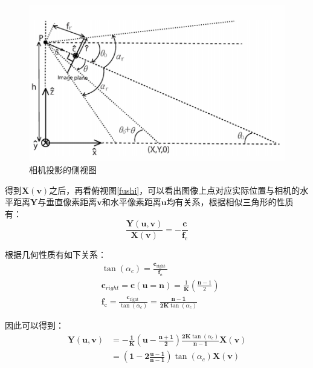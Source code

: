 \documentclass[cn,12pt,color=mine,scheme=chinese,bibstyle=gb7714-2015]{elegantbook}
\begin{document}
\begin{figure}[h]
	\centering
	\includegraphics[width=.75\linewidth]{images/ceshi}
	\caption{相机投影的侧视图}
	\label{ceshi}
\end{figure}

得到$\mathbf{X}(\mathbf{v})$之后，再看俯视图\ref{fushi}，可以看出图像上点对应实际位置与相机的水平距离$\mathbf{Y}$与垂直像素距离$\mathbf{v}$和水平像素距离$\mathbf{u}$均有关系，根据相似三角形的性质有：
\begin{equation}
	\frac{\mathbf{Y}(\mathbf{u}, \mathbf{v})}{\mathbf{X}(\mathbf{v})}=-\frac{\mathbf{c}}{\mathbf{f}_{\mathrm{c}}}
\end{equation}

根据几何性质有如下关系：
\begin{align}
	&\tan \left(\alpha_{c}\right)=\frac{\mathbf{c}_{\text {right }}}{\mathbf{f}_{\mathbf{c}}} \\
	&\mathbf{c}_{r i g h t}=\mathbf{c}(\mathbf{u}=\mathbf{n})=\frac{1}{\mathbf{K}}\left(\frac{\mathbf{n}-1}{2}\right) \\
	&\mathbf{f}_{\mathrm{c}}=\frac{\mathbf{c}_{\text {right }}}{\tan \left(\alpha_{c}\right)}=\frac{\mathbf{n}-\mathbf{1}}{\mathbf{2 K} \tan \left(\alpha_{c}\right)}
\end{align}

因此可以得到：
\begin{equation}
	\begin{aligned}
		\mathbf{Y}(\mathbf{u}, \mathbf{v}) &=-\frac{\mathbf{1}}{\mathbf{K}}\left(\mathbf{u}-\frac{\mathbf{n}+\mathbf{1}}{\mathbf{2}}\right) \frac{\mathbf{2} \mathbf{K} \tan \left(\alpha_{c}\right)}{\mathbf{n}-\mathbf{1}} \mathbf{X}(\mathbf{v}) \\
		&=\left(\mathbf{1}-\mathbf{2} \frac{\mathbf{u}-\mathbf{1}}{\mathbf{n}-\mathbf{1}}\right) \tan \left(\alpha_{c}\right) \mathbf{X}(\mathbf{v})
	\end{aligned}
\end{equation}
\end{document}
